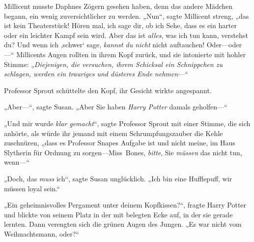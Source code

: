 Millicent musste Daphnes Zögern gesehen haben, denn das andere Mädchen begann, ein wenig zuversichtlicher zu werden. „Nun“, sagte Millicent streng, „das ist kein Theaterstück! Hören mal, ich sage dir, ob ich Sehe, dass es ein harter oder ein leichter Kampf sein wird. Aber das ist \emph{alles}, was ich tun kann, verstehst du? Und wenn ich ‚schwer‘ sage, \emph{kannst du nicht} nicht auftauchen! Oder—oder—“ Millicents Augen rollten in ihrem Kopf zurück, und sie intonierte mit hohler Stimme: „\emph{Diejenigen, die versuchen, ihrem Schicksal ein Schnippchen zu schlagen, werden ein trauriges und düsteres Ende nehmen}—“

\later

Professor Sprout schüttelte den Kopf, ihr Gesicht wirkte angespannt.

„Aber—“, sagte Susan. „Aber Sie haben \emph{Harry Potter} damals geholfen—“

„Und mir wurde \emph{klar gemacht}“, sagte Professor Sprout mit einer Stimme, die sich anhörte, als würde ihr jemand mit einem Schrumpfungszauber die Kehle zuschnüren, „dass es Professor Snapes Aufgabe ist und nicht meine, im Haus Slytherin für Ordnung zu sorgen—Miss~Bones, \emph{bitte}, Sie \emph{müssen} das nicht tun, wenn—“

„Doch, das \emph{muss} ich“, sagte Susan unglücklich. „Ich bin eine Hufflepuff, wir müssen loyal sein.“

\later

„Ein geheimnisvolles Pergament unter deinem Kopfkissen?“, fragte Harry Potter und blickte von seinem Platz in der mit  belegten Ecke auf, in der sie gerade lernten. Dann verengten sich die grünen Augen des Jungen. „Es war nicht vom Weihnachtsmann, oder?“

